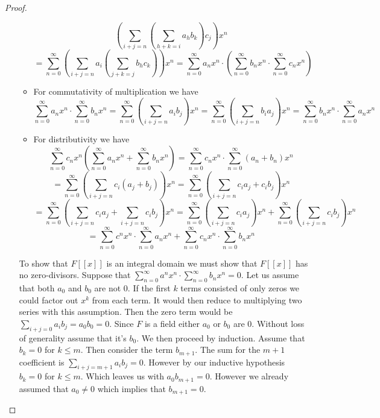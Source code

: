 \documentclass[10pt]{article}
\theoremstyle{plain}
\theoremstyle{remark}
\begin{document}
\begin{proof}
\begin{enumerate}
\begin{itemize}
\[        \left(
          \sum_{i+j=n}
          \left(
            \sum_{h+k=i}a_hb_k
          \right) c_j
        \right)x^n \]\[
        = \sum_{n=0}^\infty 
        \left(
          \sum_{i+j=n}a_i
          \left(
            \sum_{j+k=j} b_hc_k
          \right)
        \right)x^n
        =
        \sum_{n=0}^\infty a_nx^n\cdot 
        \left(
          \sum_{n=0}^\infty b_nx^n\cdot \sum_{n=0}^\infty c_nx^n
        \right)
      \]
    \item For commutativity of multiplication we have
      \[ \sum_{n=0}^\infty a_nx^n\cdot\sum_{n=0}^\infty b_nx^n=\sum_{n=0}^\infty 
        \left(
          \sum_{i+j=n}a_ib_j
        \right)x^n
        =\sum_{n=0}^\infty 
        \left(
          \sum_{i+j=n}b_ia_j
        \right)x^n
        = \sum_{n=0}^\infty b_nx^n\cdot \sum_{n=0}^\infty a_nx^n\]
    \item For distributivity we have
      \[ \sum_{n=0}^\infty c_nx^n
        \left(
          \sum_{n=0}^\infty a_nx^n+\sum_{n=0}^\infty b_nx^n
        \right)
        =
        \sum_{n=0}^\infty c_nx^n\cdot \sum_{n=0}^\infty (a_n+b_n)x^n \]\[
        =
        \sum_{n=0}^\infty 
        \left(
          \sum_{i+j=n}c_i(a_j+b_j)
        \right)x^n
        =
        \sum_{n=0}^\infty 
        \left(
          \sum_{i+j=n}c_ia_j+c_ib_j
        \right)x^n \]\[
        =
        \sum_{n=0}^\infty 
        \left(
          \sum_{i+j=n}c_ia_j+\sum_{i+j=n}c_ib_j
        \right)x^n
        =
        \sum_{n=0}^\infty
        \left(
          \sum_{i+j=n}c_ia_j
        \right)x^n
        +
        \sum_{n=0}^\infty
        \left(
          \sum_{i+j=n}c_ib_j
        \right)x^n \]\[
        =
        \sum_{n=0}^\infty c^nx^n\cdot\sum_{n=0}^\infty a_nx^n+\sum_{n=0}^\infty c_nx^n\cdot\sum_{n=0}^\infty b_nx^n
      \]
    \end{itemize}

    To show that $F[[x]]$ is an integral domain we must show that
    $F[[x]]$ has no zero-divisors. Suppose that $\sum_{n=0}^\infty a^nx^n\cdot\sum_{n=0}^\infty b_nx^n=0$.
    Let us assume that both $a_0$ and $b_0$ are not $0$.
    If the first $k$ terms consisted of only zeros we could factor out $x^{k}$ from
    each term. It would then reduce to multiplying two series with this assumption.
    Then the zero term would
    be $\sum_{i+j=0}a_ib_j=a_0b_0=0$. Since $F$ is a field either $a_0$ or $b_0$ are $0$.
    Without loss of generality assume that it's $b_0$. We then proceed by induction.
    Assume that $b_k=0$ for $k\leq m$. Then consider the term $b_{m+1}$. The sum
    for the $m+1$ coefficient is $\sum_{i+j=m+1}a_ib_j=0$. However by our inductive
    hypothesis $b_k=0$ for $k\leq m$. Which leaves us with $a_0b_{m+1}=0$. However
    we already assumed that $a_0\neq 0$ which implies that $b_{m+1}=0$.


\end{enumerate}
\end{proof}
\end{document}
